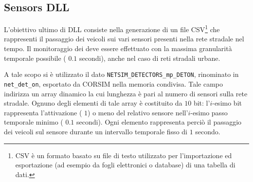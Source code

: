 \subsection{Sensors DLL}\label{subsec:sensors-dll}
L'obiettivo ultimo di  \acs{DLL} consiste nella generazione di un file \acs{CSV}\footnote{\acf{CSV} è un formato basato su file di testo utilizzato per l'importazione ed esportazione (ad esempio da fogli elettronici o database) di una tabella di dati.} che rappresenti il passaggio dei veicoli sui vari sensori presenti nella rete stradale nel tempo. Il monitoraggio dei  deve essere effettuato con la massima granularità temporale possibile (\ie{} $0.1$ secondi), anche nel caso di reti stradali urbane.

A tale scopo si è utilizzato il dato \lstinline[]|NETSIM_DETECTORS_mp_DETON|, rinominato in \lstinline[]|net_det_on|, esportato da \acs{CORSIM} nella memoria condivisa. Tale campo indirizza un array dinamico la cui lunghezza è pari al numero di sensori sulla rete stradale. Ognuno degli elementi di tale array è costituito da $10$ bit: l'$i$-esimo bit rappresenta l'attivazione (\ie{} $1$) o meno del relativo sensore nell'$i$-esimo passo temporale minimo (\ie{} $0.1$ secondi). Ogni elemento rappresenta perciò il passaggio dei veicoli sul sensore durante un intervallo temporale fisso di $1$ secondo.

